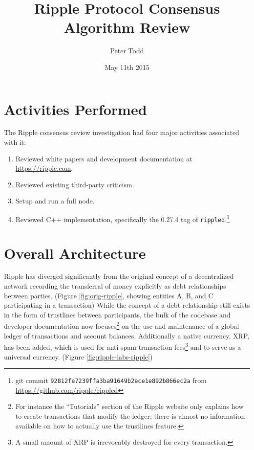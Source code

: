 \documentclass{article}
\begin{document}
\title{Ripple Protocol Consensus Algorithm Review}
\author{Peter Todd}
\date{May 11th 2015}
\maketitle

\section{Activities Performed}

The Ripple consensus review investigation had four major activities associated
with it:

\begin{enumerate}

    \item Reviewed white papers and development documentation at \url{https://ripple.com}.

    \item Reviewed existing third-party criticism.

    \item Setup and run a full node.

    \item Reviewed C++ implementation, specifically the 0.27.4 tag of
        \texttt{rippled}.\footnote{git commit
    \texttt{92812fe7239ffa3ba91649b2ece1e892b866ec2a} from \url{https://github.com/ripple/rippled}}

\end{enumerate}


\section{Overall Architecture}

Ripple has diverged significantly from the original
concept\cite{btcmag-introducing-ripple} of a decentralized network recording
the transferral of money explicitly as debt relationships between parties.
(Figure \ref{fig:orig-ripple}, showing entities A, B, and C participating in a
transaction) While the concept of a debt relationship still exists in the form
of trustlines between participants, the bulk of the codebase and developer
documentation now focuses\footnote{For instance the ``Tutorials'' section of
the Ripple website only explains how to create transactions that modify the
ledger; there is almost no information available on how to actually use the
trustlines feature.} on the use and maintenance of a global ledger of
transactions and account balances.  Additionally a native currency, XRP, has
been added, which is used for anti-spam transaction fees\footnote{A small
amount of XRP is irrevocably destroyed for every transaction.} and to
serve as a universal currency. (Figure \ref{fig:ripple-labs-ripple})
\end{document}
